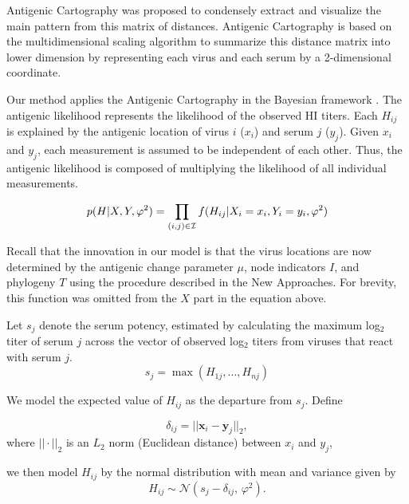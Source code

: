 \documentclass[11pt,oneside,letterpaper]{article}
\newcommand{\virus}{\mathbf{x}}						%
\newcommand{\serum}{\mathbf{y}}						%
\newcommand{\se}{s}									%
\newcommand{\mdssd}{\varphi}						%
\newcommand{\vn}{n}									%
\newcommand{\normal}{\mathcal{N}}					%
\begin{document}
Antigenic Cartography was proposed \cite{smith_mapping_2004} to condensely extract and visualize the main pattern from this matrix of distances. 
Antigenic Cartography is based on the multidimensional scaling algorithm to summarize this distance matrix into lower dimension by representing each virus and each serum by a 2-dimensional coordinate. 

Our method applies the Antigenic Cartography in the Bayesian framework \cite{bedford_integrating_2014}. 
The antigenic likelihood represents the likelihood of the observed HI titers. 
Each $H_{ij}$ is explained by the antigenic location of virus $i$ ($x_i$) and serum $j$ ($y_j$). 
Given $x_i$ and $y_j$, each measurement is assumed to be independent of each other. 
Thus, the antigenic likelihood is composed of multiplying the likelihood of all individual measurements.

\begin{equation}
 p(H|X, Y, \mdssd^2) = \prod_{(i,j) \in \cal I} f(H_{ij} |  X_i  = x_i, Y_i = y_i,\mdssd^2) 
\end{equation}

Recall that the innovation in our model is that the virus locations are now determined by the antigenic change parameter $\mu$, node indicators $I$, and phylogeny $T$ using the procedure described in the New Approaches. 
For brevity, this function was omitted from the $X$ part in the equation above.

Let $s_j$ denote the serum potency, estimated by calculating the maximum log$_2$ titer of serum $j$ across the vector of observed log$_2$ titers from viruses that react with serum $j$.
\begin{equation}
	\se_j = \max ( H_{1j},\ldots,H_{\vn j} )
\end{equation}

We model the expected value of $H_{ij}$ as the departure from $\se_j$. Define

\begin{equation}
	\delta_{ij} =  || \virus_i - \serum_j ||_2,
\end{equation}
where $|| \cdot ||_2$ is an $L_2$ norm (Euclidean distance) between $x_i$ and $y_j$,

we then model $H_{ij}$ by the normal distribution with mean and variance given by 
\begin{equation} \label{hij}
	H_{ij} \sim \normal( \se_j - \delta_{ij}, \, \mdssd^2 ).
\end{equation}
\end{document}
